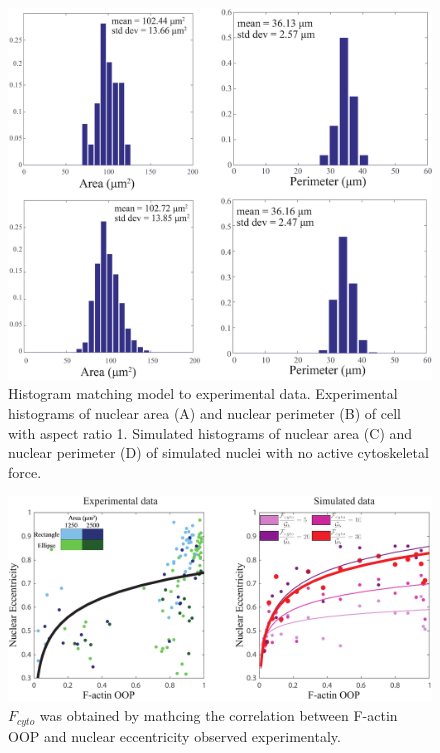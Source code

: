 \begin{figure}[h]
\centering
\captionsetup{width=.9\linewidth}
\includegraphics[width=.9\linewidth]{Project3/figs/matching_histograms_areaandperim.eps}
\caption{Histogram matching model to experimental data. Experimental histograms of nuclear area (A) and nuclear perimeter (B) of cell with aspect ratio 1. Simulated histograms of nuclear area (C) and nuclear perimeter (D) of simulated nuclei with no active cytoskeletal force.}
\label{fig::histos}
\end{figure}

\begin{figure}[h]
\centering
\captionsetup{width=.9\linewidth}
\includegraphics[width=.9\linewidth]{Project3/figs/EccentricityvsOOP.pdf}
\caption{$F_{cyto}$ was obtained by mathcing the correlation between F-actin OOP and nuclear eccentricity observed experimentaly. }
\label{fig::eccopp}
\end{figure}

